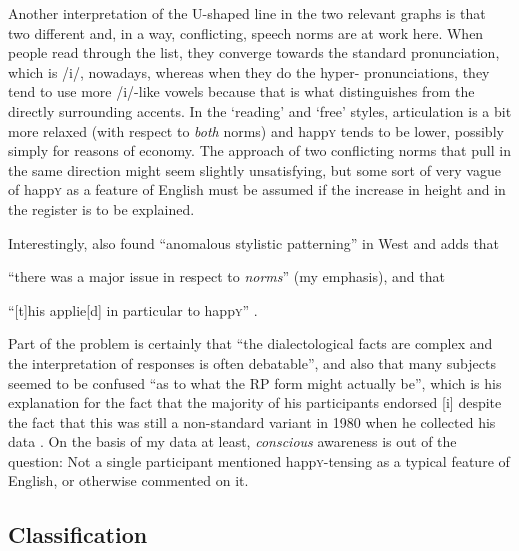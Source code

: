 Another interpretation of the U-shaped line in the two relevant graphs is that two different and, in a way, conflicting, speech norms are at work here.
When people read through the list, they converge towards the standard pronunciation, which is /i/, nowadays, whereas when they do the hyper- pronunciations, they tend to use more /i/-like vowels because that is what distinguishes  from the directly surrounding accents.
In the `reading' and `free' styles, articulation is a bit more relaxed (with respect to \emph{both} norms) and happ\textsc{y} tends to be lower, possibly simply for reasons of economy.
The approach of two conflicting norms that pull in the same direction might seem slightly unsatisfying, but some sort of very vague  of happ\textsc{y} as a feature of  English must be assumed if the increase in height and  in the  register is to be explained.

Interestingly, \textcite[102]{newbrook1999} also found ``anomalous stylistic patterning'' in West  and adds that 
\begin{inparaenum}[(a)]
	\item ``there was a major issue in respect to \emph{norms}'' (my emphasis), and that
	\item ``[t]his applie[d] in particular to happ\textsc{y}'' \parencite[102]{newbrook1999}.
\end{inparaenum}
Part of the problem is certainly that ``the dialectological facts are complex and the interpretation of responses is often debatable'', and also that many subjects seemed to be confused ``as to what the RP form might actually be'', which is his explanation for the fact that the majority of his participants endorsed [i] despite the fact that this was still a non-standard variant in 1980 when he collected his data \parencite[101]{newbrook1999}.
On the basis of my data at least, \emph{conscious} awareness is out of the question: Not a single participant mentioned happ\textsc{y}-tensing as a typical feature of  English, or otherwise commented on it.

\subsection{Classification}
\label{prod.disc.happy.classification}

